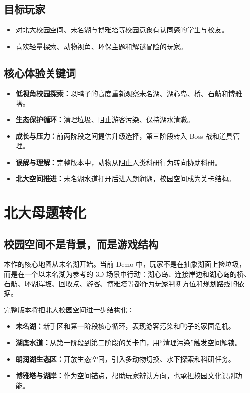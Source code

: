 \documentclass[UTF8,a4paper,12pt]{ctexart}
\begin{document}
\subsection{目标玩家}

\begin{itemize}
  \item 对北大校园空间、未名湖与博雅塔等校园意象有认同感的学生与校友。
  \item 喜欢轻量探索、动物视角、环保主题和解谜冒险的玩家。
\end{itemize}

\subsection{核心体验关键词}

\begin{itemize}
  \item \textbf{低视角校园探索：}以鸭子的高度重新观察未名湖、湖心岛、桥、石舫和博雅塔。
  \item \textbf{生态保护循环：}清理垃圾、阻止游客污染、保持湖水清澈。
  \item \textbf{成长与压力：}前两阶段之间提供升级选择，第三阶段转入 Boss 战和道具管理。
  \item \textbf{误解与理解：}完整版本中，动物从阻止人类科研行为转向协助科研。
  \item \textbf{北大空间推进：}未名湖水道打开后进入朗润湖，校园空间成为关卡结构。
\end{itemize}

\section{北大母题转化}

\subsection{校园空间不是背景，而是游戏结构}

本作的核心地图从未名湖开始。当前 Demo 中，玩家不是在抽象湖面上捡垃圾，而是在一个以未名湖为参考的 3D 场景中行动：湖心岛、连接岸边和湖心岛的桥、石舫、环湖岸坡、回收点、游客、博雅塔等都作为玩家判断方位和规划路线的依据。

完整版本将把北大校园空间进一步结构化：

\begin{itemize}
  \item \textbf{未名湖：}新手区和第一阶段核心循环，表现游客污染和鸭子的家园危机。
  \item \textbf{湖底水道：}从第一阶段到第二阶段的关卡门，用``清理污染''触发空间解锁。
  \item \textbf{朗润湖生态区：}开放生态空间，引入多动物切换、水下探索和科研任务。
  \item \textbf{博雅塔与湖岸：}作为空间锚点，帮助玩家辨认方向，也承担校园文化识别功能。
\end{itemize}
\end{document}
